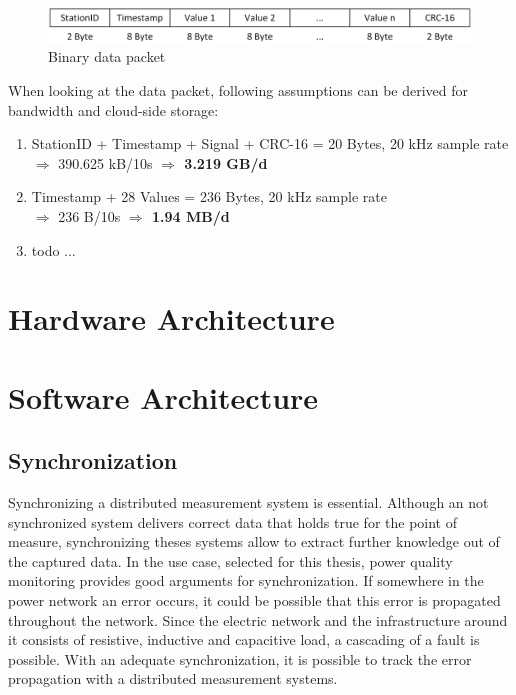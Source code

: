 \begin{figure}[h]
	\centering
		\includegraphics[scale=0.4]{graphics/BinDataPacket.eps}
	\caption{Binary data packet}
	\label{fig:BinDataPacket}
\end{figure}

When looking at the data packet, following assumptions can be derived for bandwidth and cloud-side storage:

\begin{enumerate}
	\item StationID + Timestamp + Signal + CRC-16 = 20 Bytes, 20 kHz sample rate \\ $\Rightarrow$ 390.625 kB/10s \textbf{$\Rightarrow$ 3.219 GB/d}
	\item Timestamp + 28 Values = 236 Bytes, 20 kHz sample rate \\ $\Rightarrow$ 236 B/10s \textbf{$\Rightarrow$ 1.94 MB/d}
	\item todo ...
\end{enumerate}

\section{Hardware Architecture}

\section{Software Architecture}

\subsection{Synchronization}
Synchronizing a distributed measurement system is essential. Although an not synchronized system delivers correct data that holds true for the point of measure, synchronizing theses systems allow to extract further knowledge out of the captured data. In the use case, selected for this thesis, power quality monitoring provides good arguments for synchronization. If somewhere in the power network an error occurs, it could be possible that this error is propagated throughout the network. Since the electric network and the infrastructure around it consists of resistive, inductive and capacitive load, a cascading of a fault is possible. With an adequate synchronization, it is possible to track the error propagation with a distributed measurement systems.

